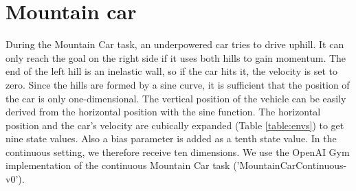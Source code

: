 \section{Mountain car}


During the Mountain Car task, an underpowered car tries to drive uphill. It can only reach the goal on the right side if it uses both hills to gain momentum. The end of the left hill is an inelastic wall, so if the car hits it, the velocity is set to zero. Since the hills are formed by a sine curve, it is sufficient that the position of the car is only one-dimensional. The vertical position of the vehicle can be easily derived from the horizontal position with the sine function. The horizontal position and the car's velocity are cubically expanded (Table \ref{table:envs}) to get nine state values. Also a bias parameter is added as a tenth state value. In the continuous setting, we therefore receive ten dimensions. We use the OpenAI Gym implementation of the continuous Mountain Car task ('MountainCarContinuous-v0').




%
%

